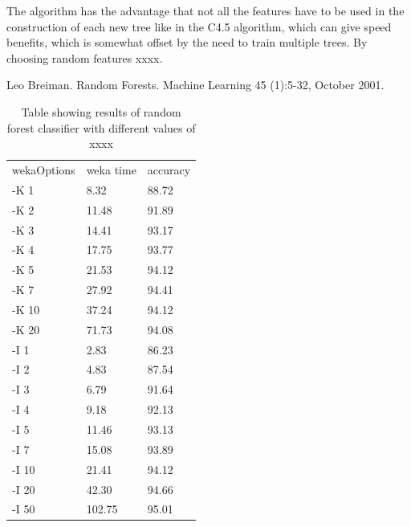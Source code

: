 \documentclass[12pt,oneside]{book}
\begin{document}
The algorithm has the advantage that not all the features have to be
used in the construction of each new tree like in the C4.5 algorithm,
which can give speed benefits, which is somewhat offset by the need to
train multiple trees.  By choosing random features xxxx.



Leo Breiman. Random Forests. Machine Learning 45 (1):5-32, October 2001.


\begin{table}
\begin{tabular}{|l|l|l|}
\hline

wekaOptions          & weka time       &accuracy        \\
-K 1                 & 8.32            & 88.72           \\
-K 2                 & 11.48           & 91.89           \\
-K 3                 & 14.41           & 93.17           \\
-K 4                 & 17.75           & 93.77           \\
-K 5                 & 21.53           & 94.12           \\
-K 7                 & 27.92           & 94.41           \\
-K 10                & 37.24           & 94.12           \\
-K 20                & 71.73           & 94.08           \\
-I 1                 & 2.83            & 86.23           \\
-I 2                 & 4.83            & 87.54           \\
-I 3                 & 6.79            & 91.64           \\
-I 4                 & 9.18            & 92.13           \\
-I 5                 & 11.46           & 93.13           \\
-I 7                 & 15.08           & 93.89           \\
-I 10                & 21.41           & 94.12           \\
-I 20                & 42.30           & 94.66           \\
-I 50                & 102.75          & 95.01           \\


\hline
\end{tabular}
\caption{Table showing results of random forest classifier with
  different values of xxxx}
\label{table:obv-13-randomForest}
\end{table}
\end{document}
